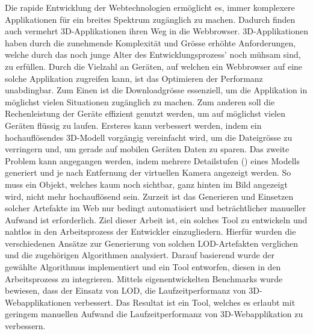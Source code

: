Die rapide Entwicklung der Webtechnologien ermöglicht es, immer komplexere Applikationen für ein breites Spektrum zugänglich zu machen. Dadurch finden auch vermehrt 3D-Applikationen ihren Weg in die Webbrowser.
3D-Applikationen haben durch die zunehmende Komplexität und Grösse erhöhte Anforderungen, welche durch das noch junge Alter des Entwicklungsprozess' noch mühsam sind, zu erfüllen.
Durch die Vielzahl an Geräten, auf welchen ein Webbrowser auf eine solche Applikation zugreifen kann, ist das Optimieren der Performanz unabdingbar.
Zum Einen ist die Downloadgrösse essenziell, um die Applikation in möglichst vielen Situationen zugänglich zu machen. Zum anderen soll die Rechenleistung der Geräte effizient genutzt werden, um auf möglichst vielen Geräten flüssig zu laufen.
Ersteres kann verbessert werden, indem ein hochauflösendes 3D-Modell vorgängig vereinfacht wird, um die Dateigrösse zu verringern und, um gerade auf mobilen Geräten Daten zu sparen.
Das zweite Problem kann angegangen werden, indem mehrere Detailstufen () eines Modells generiert und je nach Entfernung der virtuellen Kamera angezeigt werden. So muss ein Objekt, welches kaum noch sichtbar, ganz hinten im Bild angezeigt wird, nicht mehr hochauflösend sein.
Zurzeit ist das Generieren und Einsetzen solcher Artefakte im Web nur bedingt automatisiert und beträchtlicher manueller Aufwand ist erforderlich.
Ziel dieser Arbeit ist, ein solches Tool zu entwickeln und nahtlos in den Arbeitsprozess der Entwickler einzugliedern.
\bigbreak
Hierfür wurden die verschiedenen Ansätze zur Generierung von solchen LOD-Artefakten verglichen und die zugehörigen Algorithmen analysiert.
Darauf basierend wurde der gewählte Algorithmus implementiert und ein Tool entworfen, diesen in den Arbeitsprozess zu integrieren.
Mittels eigenentwickelten Benchmarks wurde bewiesen, dass der Einsatz von LOD, die Laufzeitperformanz von 3D-Webapplikationen verbessert.
\bigbreak
Das Resultat ist ein Tool, welches es erlaubt mit geringem manuellen Aufwand die Laufzeitperformanz von 3D-Webapplikation zu verbessern.
